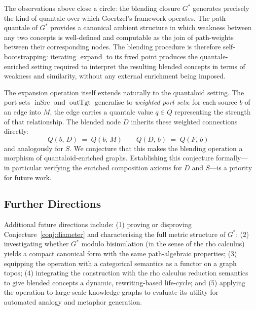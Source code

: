 \documentclass[11pt, a4paper]{article}
\theoremstyle{definition}
\theoremstyle{plain}
\theoremstyle{remark}
\newcommand{\inSrc}{\operatorname{inSrc}}
\newcommand{\outTgt}{\operatorname{outTgt}}
\newcommand{\expand}{\operatorname{expand}}
\begin{document}
The observations above close a circle: the blending closure $G^*$ generates
precisely the kind of quantale over which Goertzel's framework operates.  The
path quantale of $G^*$ provides a canonical ambient structure in which weakness
between any two concepts is well-defined and computable as the join of
path-weights between their corresponding nodes.  The blending procedure is
therefore self-bootstrapping: iterating $\expand$ to its fixed point produces
the quantale-enriched setting required to interpret the resulting blended
concepts in terms of weakness and similarity, without any external enrichment
being imposed.

The expansion operation itself extends naturally to the quantaloid setting.
The port sets $\inSrc$ and $\outTgt$ generalise to \emph{weighted port sets}:
for each source $b$ of an edge into $M$, the edge carries a quantale value
$q \in Q$ representing the strength of that relationship.  The blended node $D$
inherits these weighted connections directly:
\[
  Q(b,\, D) \;=\; Q(b,\, M)
  \qquad
  Q(D,\, b) \;=\; Q(F,\, b)
\]
and analogously for $S$.  We conjecture that this makes the blending operation
a morphism of quantaloid-enriched graphs.  Establishing this conjecture
formally---in particular verifying the enriched composition axioms for $D$ and
$S$---is a priority for future work.

\subsection*{Further Directions}

Additional future directions include: (1) proving or disproving
Conjecture~\ref{conj:diameter} and characterising the full metric structure of
$G^*$; (2) investigating whether $G^*$ modulo bisimulation (in the sense of the
rho calculus) yields a compact canonical form with the same path-algebraic
properties; (3) equipping the operation with a categorical semantics as a
functor on a graph topos; (4) integrating the construction with the rho
calculus reduction semantics to give blended concepts a dynamic,
rewriting-based life-cycle; and (5) applying the operation to large-scale
knowledge graphs to evaluate its utility for automated analogy and metaphor
generation.
\end{document}
